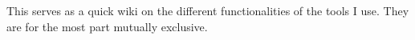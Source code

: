 This serves as a quick wiki on the different functionalities of the tools I use. They are for the most part mutually exclusive. 
